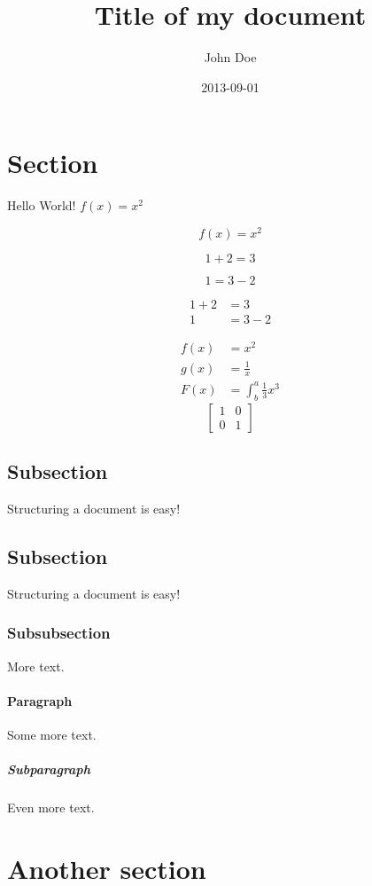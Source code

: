 \documentclass{article}
\title{Title of my document}
\date{2013-09-01}
\author{John Doe}
\begin{document}
\maketitle
{}
\newpage
{}

\section{Section}

Hello World! $f(x) = x^2$

\begin{equation}
    f(x) = x^2
  \end{equation}
  
  \begin{equation*}
    1 + 2 = 3 
  \end{equation*}
  
  \begin{equation*}
    1 = 3 - 2
  \end{equation*}
  
  \begin{align*}
    1 + 2 &= 3\\
    1 &= 3 - 2
  \end{align*}

  \begin{align*}
    f(x) &= x^2\\
    g(x) &= \frac{1}{x}\\
    F(x) &= \int^a_b \frac{1}{3}x^3
  \end{align*}
  \begin{equation}
  \left[
    \begin{matrix}
    1 & 0\\
    0 & 1
    \end{matrix}
    \right]
  \end{equation}

\newpage
\subsection{Subsection}

Structuring a document is easy!

\subsection{Subsection}

Structuring a document is easy!

\subsubsection{Subsubsection}

More text.

\paragraph{Paragraph}

Some more text.

\subparagraph{Subparagraph}

Even more text.

\section{Another section}
\end{document}
